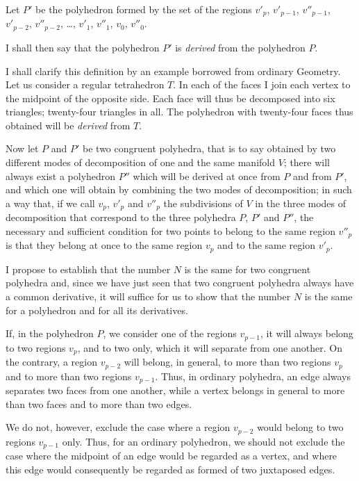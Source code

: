 \documentclass{article}
\begin{document}
Let $P'$ be the polyhedron formed by the set of the regions $v'_{p}$, $v'_{p-1}$, $v''_{p-1}$, $v'_{p-2}$, $v''_{p-2}$, \ldots, $v'_{1}$, $v''_{1}$, $v_{0}$, $v''_{0}$.

I shall then say that the polyhedron $P'$ is \emph{derived} from the polyhedron $P$.

I shall clarify this definition by an example borrowed from ordinary Geometry. Let us consider a regular tetrahedron $T$. In each of the faces I join each vertex to the midpoint of the opposite side. Each face will thus be decomposed into six triangles; twenty-four triangles in all. The polyhedron with twenty-four faces thus obtained will be \emph{derived} from $T$.

Now let $P$ and $P'$ be two congruent polyhedra, that is to say obtained by two different modes of decomposition of one and the same manifold $V$; there will always exist a polyhedron $P''$ which will be derived at once from $P$ and from $P'$, and which one will obtain by combining the two modes of decomposition; in such a way that, if we call $v_{p}$, $v'_{p}$ and $v''_{p}$ the subdivisions of $V$ in the three modes of decomposition that correspond to the three polyhedra $P$, $P'$ and $P''$, the necessary and sufficient condition for two points to belong to the same region $v''_{p}$ is that they belong at once to the same region $v_{p}$ and to the same region $v'_{p}$.

I propose to establish that the number $N$ is the same for two congruent polyhedra and, since we have just seen that two congruent polyhedra always have a common derivative, it will suffice for us to show that the number $N$ is the same for a polyhedron and for all its derivatives.

If, in the polyhedron $P$, we consider one of the regions $v_{p-1}$, it will always belong to two regions $v_{p}$, and to two only, which it will separate from one another. On the contrary, a region $v_{p-2}$ will belong, in general, to more than two regions $v_{p}$ and to more than two regions $v_{p-1}$. Thus, in ordinary polyhedra, an edge always separates two faces from one another, while a vertex belongs in general to more than two faces and to more than two edges.

We do not, however, exclude the case where a region $v_{p-2}$ would belong to two regions $v_{p-1}$ only. Thus, for an ordinary polyhedron, we should not exclude the case where the midpoint of an edge would be regarded as a vertex, and where this edge would consequently be regarded as formed of two juxtaposed edges.
\end{document}
